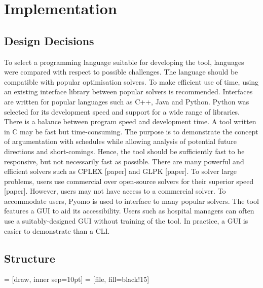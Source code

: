 \chapter{Implementation}

\section{Design Decisions}

To select a programming language suitable for developing the tool, languages were compared with respect to possible challenges. The language should be compatible with popular optimisation solvers. To make efficient use of time, using an existing interface library between popular solvers is recommended. Interfaces are written for popular languages such as C++, Java and Python. Python was selected for its development speed and support for a wide range of libraries.
\linespace
There is a balance between program speed and development time. A tool written in C may be fast but time-consuming. The purpose is to demonstrate the concept of argumentation with schedules while allowing analysis of potential future directions and short-comings. Hence, the tool should be sufficiently fast to be responsive, but not necessarily fast as possible.
\linespace
There are many powerful and efficient solvers such as CPLEX [paper] and GLPK [paper]. To solver large problems, users use commercial over open-source solvers for their superior speed [paper]. However, users may not have access to a commercial solver. To accommodate users, Pyomo is used to interface to many popular solvers.
\linespace
The tool features a GUI to aid its accessibility. Users such as hospital managers can often use a suitably-designed GUI without training of the tool. In practice, a GUI is easier to demonstrate than a CLI.

\section{Structure}

 = [draw, inner sep=10pt]
 = [file, fill=black!15]

